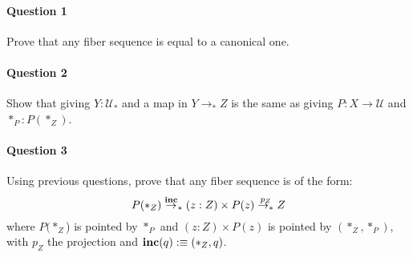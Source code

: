 \documentclass{article}[6pt]%
\newcommand{\U}{{\mathcal U}}
\renewcommand{\r}{\rightarrow}
\newcommand{\inc}{\mathrm{\bf inc}}
\begin{document}
\begin{Exercise}[title={Canonical fiber sequence},difficulty=1]

\paragraph{Question 1} Prove that any fiber sequence is equal to a canonical one.

\paragraph{Question 2} Show that giving $Y:\U_*$ and a map in $Y\r_* Z$ is the same as giving $P:X\r \U$ and $*_P:P(*_Z)$.

\paragraph{Question 3} Using previous questions, prove that any fiber sequence is of the form:
 \[P(*_Z) \overset{\inc}\r_* (z:Z)\times P(z)\overset{p_Z}{\r_*} Z\]
 where $P(*_Z$) is pointed by $*_P$ and $(z:Z)\times P(z)$ is pointed by $(*_Z,*_P)$, with $p_Z$ the projection and $\inc(q):\equiv (*_Z,q)$.
\end{Exercise}
\end{document}
